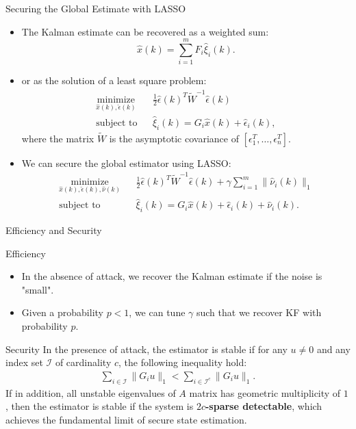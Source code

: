 \documentclass[10pt]{beamer}
\DeclareMathOperator{\1}{\textbf{1}}
\begin{document}
\begin{frame}{Securing the Global Estimate with LASSO}
  \begin{itemize}
    \item The Kalman estimate can be recovered as a weighted sum:
      \begin{equation*}
	  \hat x(k)=\sum_{i=1}^m F_i\hat \xi_i(k).
      \end{equation*}
    \item or as the solution of a least square problem:
      \begin{align*}
      &\mathop{\textrm{minimize}}\limits_{\hat x(k),\hat \epsilon(k)}&
      & \frac{1}{2}\hat \epsilon(k)^T \tilde W^{-1} \hat \epsilon(k)\\
      &\textrm{subject to} &
      &\hat \xi_i(k)  =  G_i\hat x(k) + \hat \epsilon_i(k),&
      \end{align*}
      where the matrix $\tilde W$ is the asymptotic covariance of $[\epsilon_1^T,\ldots ,\epsilon_n^T]$.

    \item We can secure the global estimator using LASSO:
      \begin{align*}
    &\mathop{\textrm{minimize}}\limits_{\hat x(k),\hat \epsilon(k), \hat \nu(k)}&
    & \frac{1}{2}\hat \epsilon(k)^T \tilde W^{-1} \hat \epsilon(k) + \gamma \sum_{i=1}^m \|\hat \nu_i(k)\|_1\\
    &\textrm{subject to} &
    &\hat \xi_i(k)  =  G_i\hat x(k) + \hat \epsilon_i(k)+\hat \nu_i(k).&
      \end{align*}
  \end{itemize}
\end{frame}

\begin{frame}{Efficiency and Security}
  \begin{block}{Efficiency}
    \begin{itemize}
      \item In the absence of attack, we recover the Kalman estimate if the noise is "small".
      \item Given a probability $p<1$, we can tune $\gamma$ such that we recover KF with probability $p$.
    \end{itemize}
  \end{block}
  \begin{block}{Security}
    In the presence of attack, the estimator is stable if for any $u\neq 0$ and any index set $\mathcal I$ of cardinality $c$, the following inequality hold:
    \begin{align*}
      \sum_{i\in \mathcal I} \|G_iu\|_1 < \sum_{i\in \mathcal I^c} \|G_iu\|_1. 
    \end{align*}
    If in addition, all unstable eigenvalues of $A$ matrix has geometric multiplicity of $1$, then the estimator is stable if the system is {\bf $2c$-sparse detectable}, which achieves the fundamental limit of secure state estimation.
  \end{block}
\end{frame}
\end{document}
